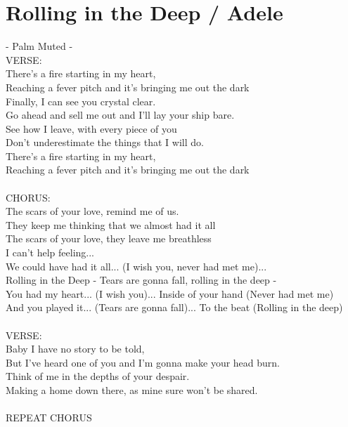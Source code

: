 \section{Rolling in the Deep / Adele}\label{sec:rollinginthedeep}

\Gmajor
\AminorSeven
\BminorSeven


 - Palm Muted -\\

VERSE:          \\              
There's a fire starting in my heart,      \\                                          
 Reaching a fever pitch and it's bringing me out the dark\\
Finally, I can see you crystal clear.\\
Go ahead and sell me out and I'll lay your ship bare.\\
See how I leave, with every piece of you\\
Don't underestimate the things that I will do.\\
There's a fire starting in my heart,\\
Reaching a fever pitch and it's bringing me out the dark\\
\\
CHORUS:           \\
The scars of your love, remind me of us.        \\           
They keep me thinking that we almost had it all\\
The scars of your love, they leave me breathless\\
I can't help feeling...\\
We could have had it all... (I wish you, never had met me)...\\
Rolling in the Deep - Tears are gonna fall, rolling in the deep -\\
You had my heart... (I wish you)... Inside of your hand (Never had met me)\\
And you played it... (Tears are gonna fall)... To the beat (Rolling in the deep)\\
\\
VERSE:     \\
Baby I have no story to be told,\\
But I've heard one of you and I'm gonna make your head burn.\\
Think of me in the depths of your despair.\\
Making a home down there, as mine sure won't be shared.\\
                        \\
REPEAT CHORUS
